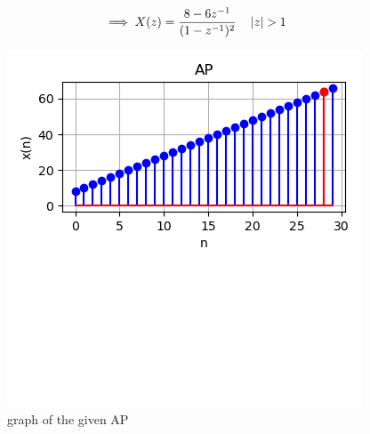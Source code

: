\documentclass[journal,12pt,twocolumn]{IEEEtran}
\begin{document}
\begin{equation}
\implies X(z)=\frac{8-6z^{-1}}{(1-z^{-1})^2} \quad \left\vert z\right\vert>1
\end{equation}
\begin{figure}[h!]
    \centering
    \includegraphics[width=\columnwidth]{figs/plot.png}
    \caption{graph of the given AP}
    \label{fig:1}
\end{figure}
\end{document}
